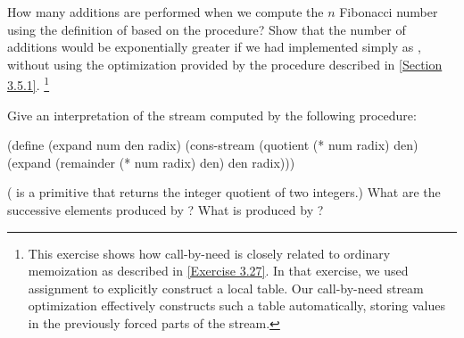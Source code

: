 \begin{exercise}
	\label{Exercise 3.57}
		How many additions are performed when we compute the \( n \) Fibonacci number using the definition of  based on the  procedure?
		Show that the number of additions would be exponentially greater if we had implemented  simply as , without using the optimization provided by the  procedure described in \cref{Section 3.5.1}.%
	\footnote{
		This exercise shows how call-by-need is closely related to ordinary memoization as described in \cref{Exercise 3.27}.
		In that exercise, we used assignment to explicitly construct a local table.
		Our call-by-need stream optimization effectively constructs such a table automatically, storing values in the previously forced parts of the stream.
	}
\end{exercise}



\begin{exercise}
	\label{Exercise 3.58}
	Give an interpretation of the stream computed by the following procedure:
	\begin{scheme}
	  (define (expand num den radix)
	    (cons-stream
	     (quotient (* num radix) den)
	     (expand (remainder (* num radix) den) den radix)))
	\end{scheme}
	( is a primitive that returns the integer quotient of two
	integers.)
	What are the successive elements produced by ?
	What is produced by ?
\end{exercise}

